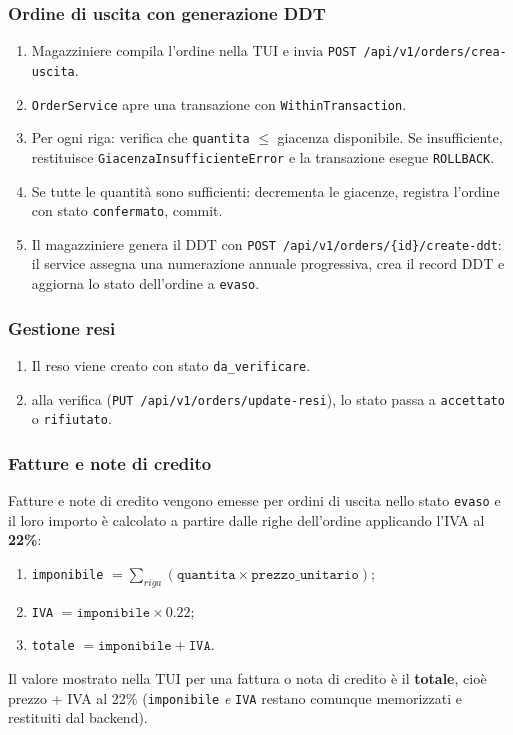 \documentclass[a4paper,12pt]{article}
\begin{document}
\subsubsection{Ordine di uscita con generazione DDT}
\begin{enumerate}
    \item Magazziniere compila l'ordine nella TUI e invia \texttt{POST /api/v1/orders/crea-uscita}.
    \item \texttt{OrderService} apre una transazione con \texttt{WithinTransaction}.
    \item Per ogni riga: verifica che \texttt{quantita} $\leq$ giacenza disponibile. Se insufficiente, restituisce \texttt{GiacenzaInsufficienteError} e la transazione esegue \texttt{ROLLBACK}.
    \item Se tutte le quantità sono sufficienti: decrementa le giacenze, registra l'ordine con stato \texttt{confermato}, commit.
    \item Il magazziniere genera il DDT con \texttt{POST /api/v1/orders/\{id\}/create-ddt}: il service assegna una numerazione annuale progressiva, crea il record DDT e aggiorna lo stato dell'ordine a \texttt{evaso}.
\end{enumerate}

\subsubsection{Gestione resi}
\begin{enumerate}
    \item Il reso viene creato con stato \texttt{da\_verificare}.
    \item alla verifica (\texttt{PUT /api/v1/orders/update-resi}), lo stato passa a \texttt{accettato} o \texttt{rifiutato}. 
\end{enumerate}

\subsubsection{Fatture e note di credito}
Fatture e note di credito vengono emesse per ordini di uscita nello stato \texttt{evaso} e il loro importo è calcolato a partire dalle righe dell'ordine applicando l'IVA al \textbf{22\%}:
\begin{enumerate}
    \item \texttt{imponibile} $=\displaystyle\sum_{riga}(\texttt{quantita} \times \texttt{prezzo\_unitario})$;
    \item \texttt{IVA} $= \texttt{imponibile} \times 0.22$;
    \item \texttt{totale} $= \texttt{imponibile} + \texttt{IVA}$.
\end{enumerate}
Il valore mostrato nella TUI per una fattura o nota di credito è il \textbf{totale}, cioè prezzo + IVA al 22\% (\texttt{imponibile} \emph{e} \texttt{IVA} restano comunque memorizzati e restituiti dal backend).
\end{document}
